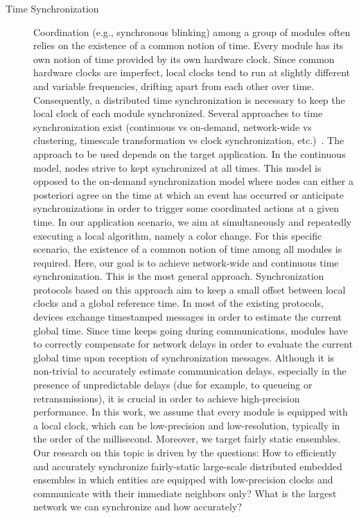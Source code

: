 \begin{description}
	\item[Time Synchronization] Coordination (e.g., synchronous blinking) among a group of modules often relies on the existence of a common notion of time. Every module has its own notion of time provided by its own hardware clock. Since common hardware clocks are imperfect, local clocks tend to run at slightly different and variable frequencies, drifting apart from each other over time. Consequently, a distributed time synchronization is necessary to keep the local clock of each module synchronized. Several approaches to time synchronization exist (continuous vs on-demand, network-wide vs clustering, timescale transformation vs clock synchronization, etc.)~\cite{romer2005time}. The approach to be used depends on the target application. In the continuous model, nodes strive to kept synchronized at all times. This model is opposed to the on-demand synchronization model where nodes can either a posteriori agree on the time at which an event has occurred or anticipate synchronizations in order to trigger some coordinated actions at a given time. In our application scenario, we aim at simultaneously and repeatedly executing a local algorithm, namely a color change. For this specific scenario, the existence of a common notion of time among all modules is required. Here, our goal is to achieve network-wide and continuous time synchronization. This is the most general approach. Synchronization protocols based on this approach aim to keep a small offset between local clocks and a global reference time. In most of the existing protocols, devices exchange timestamped messages in order to estimate the current global time. Since time keeps going during communications, modules have to correctly compensate for network delays in order to evaluate the current global time upon reception of synchronization messages. Although it is non-trivial to accurately estimate communication delays, especially in the presence of unpredictable delays (due for example, to queueing or retransmissions), it is crucial in order to achieve high-precision performance. In this work, we assume that every module is equipped with a local clock, which can be low-precision and low-resolution, typically in the order of the millisecond. Moreover, we target fairly static ensembles. Our research on this topic is driven by the questions: How to efficiently and accurately synchronize fairly-static large-scale distributed embedded ensembles in which entities are equipped with low-precision clocks and communicate with their immediate neighbors only? What is the largest network we can synchronize and how accurately?
	

\end{description}
